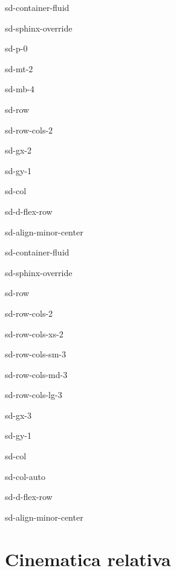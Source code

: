 \documentclass[letterpaper,10pt,english]{jupyterBook}
\begin{document}
\begin{sphinxuseclass}{sd-container-fluid}
\begin{sphinxuseclass}{sd-sphinx-override}
\begin{sphinxuseclass}{sd-p-0}
\begin{sphinxuseclass}{sd-mt-2}
\begin{sphinxuseclass}{sd-mb-4}
\begin{sphinxuseclass}{sd-row}
\begin{sphinxuseclass}{sd-row-cols-2}
\begin{sphinxuseclass}{sd-gx-2}
\begin{sphinxuseclass}{sd-gy-1}
\begin{sphinxuseclass}{sd-col}
\begin{sphinxuseclass}{sd-d-flex-row}
\begin{sphinxuseclass}{sd-align-minor-center}
\begin{sphinxuseclass}{sd-container-fluid}
\begin{sphinxuseclass}{sd-sphinx-override}
\begin{sphinxuseclass}{sd-row}
\begin{sphinxuseclass}{sd-row-cols-2}
\begin{sphinxuseclass}{sd-row-cols-xs-2}
\begin{sphinxuseclass}{sd-row-cols-sm-3}
\begin{sphinxuseclass}{sd-row-cols-md-3}
\begin{sphinxuseclass}{sd-row-cols-lg-3}
\begin{sphinxuseclass}{sd-gx-3}
\begin{sphinxuseclass}{sd-gy-1}
\begin{sphinxuseclass}{sd-col}
\begin{sphinxuseclass}{sd-col-auto}
\begin{sphinxuseclass}{sd-d-flex-row}
\begin{sphinxuseclass}{sd-align-minor-center}
\end{sphinxuseclass}
\end{sphinxuseclass}
\end{sphinxuseclass}
\end{sphinxuseclass}
\end{sphinxuseclass}
\end{sphinxuseclass}
\end{sphinxuseclass}
\end{sphinxuseclass}
\end{sphinxuseclass}
\end{sphinxuseclass}
\end{sphinxuseclass}
\end{sphinxuseclass}
\end{sphinxuseclass}
\end{sphinxuseclass}
\end{sphinxuseclass}
\end{sphinxuseclass}
\end{sphinxuseclass}
\end{sphinxuseclass}
\end{sphinxuseclass}
\end{sphinxuseclass}
\end{sphinxuseclass}
\end{sphinxuseclass}
\end{sphinxuseclass}
\end{sphinxuseclass}
\end{sphinxuseclass}
\end{sphinxuseclass}

\section{Cinematica relativa}
\label{\detokenize{ch/kinematics-relative:cinematica-relativa}}\label{\detokenize{ch/kinematics-relative:classical-mechanics-kinematics-relative}}\label{\detokenize{ch/kinematics-relative::doc}}
\sphinxstepscope
\end{document}
